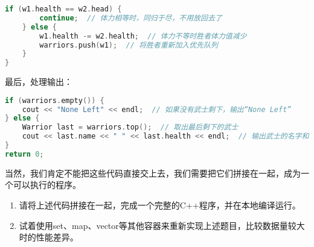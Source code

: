 \documentclass[../main.tex]{subfiles}
\begin{document}
\begin{answer}
\begin{lstlisting}[language=C++]
    if (w1.health == w2.head) {
        continue;  // 体力相等时，同归于尽，不用放回去了
    } else {
        w1.health -= w2.health;  // 体力不等时胜者体力值减少
        warriors.push(w1);  // 将胜者重新加入优先队列
    }
}
\end{lstlisting}

  最后，处理输出：
\begin{lstlisting}[language=C++]
if (warriors.empty()) {
    cout << "None Left" << endl;  // 如果没有武士剩下，输出“None Left”
} else {
    Warrior last = warriors.top();  // 取出最后剩下的武士
    cout << last.name << " " << last.health << endl;  // 输出武士的名字和体力值
}
return 0;
\end{lstlisting}

  当然，我们肯定不能把这些代码直接交上去，我们需要把它们拼接在一起，成为一个可以执行的程序。
\end{answer}

\begin{exercise}
  \begin{enumerate}
    \item 请将上述代码拼接在一起，完成一个完整的C++程序，并在本地编译运行。
    \item 试着使用set、map、vector等其他容器来重新实现上述题目，比较数据量较大时的性能差异。
  \end{enumerate}
\end{exercise}
\end{document}
